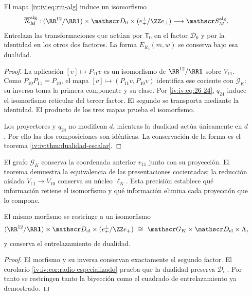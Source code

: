 \begin{theorem}
\label{iv:iv:thm:pantallas-isomorfas}
\label{iv:thm:k-pantallas-coordinadas}
El mapa \eqref{iv:iv:eq:rm-alg} induce un isomorfismo
\[
 \overline{\mathcal R}_M^{\mathrm{alg}}:
 (\RR^{12}/\RR\mathbf1)\times\mathscr D_0
 \times(e_+^\perp/\ZZ e_+)
 \longrightarrow\mathscr S_M^{\mathrm{alg}}.
\]
Entrelaza las transformaciones que actúan por \(\mathsf T_0\)
en el factor \(\mathscr D_0\) y por la identidad en los
otros dos factores. La forma \(E_{R_0}(m,w)\) se conserva
bajo esa dualidad.
\end{theorem}
\begin{proof}
La aplicación \([v]\mapsto P_{11}v\) es un isomorfismo
de \(\RR^{12}/\RR\mathbf1\) sobre \(V_{11}\).
Como \(P_{10}P_{11}=P_{10}\), el mapa
\([v]\mapsto(P_{11}v,P_{10}v)\) identifica ese cociente
con \(\mathscr G_K\); su inversa toma la primera componente
y su clase. Por \eqref{iv:iv:eq:26-24}, \(q_{24}\) induce el
isomorfismo reticular del tercer factor. El segundo se
transporta mediante la identidad. El producto de los tres
mapas prueba el isomorfismo.

Los proyectores y \(q_{24}\) no modifican \(d\), mientras
la dualidad actúa únicamente en \(d\). Por ello las dos
composiciones son idénticas. La conservación de la forma
es el teorema \ref{iv:iv:thm:dualidad-escalar}.
\end{proof}

El grafo \(\mathscr G_K\) conserva la coordenada anterior
\(v_{11}\) junto con su proyección. El teorema demuestra
la equivalencia de las presentaciones cocientadas; la reducción
aislada \(V_{11}\to V_{10}\) conserva su núcleo
\(\ell_K\). Esta precisión establece qué información
retiene el isomorfismo y qué información elimina cada
proyección que lo compone.

\begin{corollary}
El mismo morfismo se restringe a un isomorfismo
\[
 (\RR^{12}/\RR\mathbf1)\times\mathscr D_{\mathrm{el}}
 \times(e_+^\perp/\ZZ e_+)
 \ \cong\ \mathscr G_K\times\mathscr D_{\mathrm{el}}\times\Lambda,
\]
y conserva el entrelazamiento de dualidad.
\end{corollary}
\begin{proof}
El morfismo y su inversa conservan exactamente el segundo factor.
El corolario \ref{iv:iv:cor:radio-especializado} prueba que la dualidad
preserva \(\mathscr D_{\mathrm{el}}\). Por tanto se restringen
tanto la biyección como el cuadrado de entrelazamiento ya demostrado.
\end{proof}

